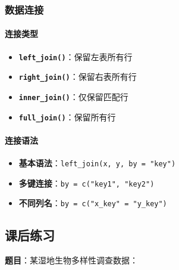 \documentclass[
]{book}
\providecommand{\tightlist}{%
  \setlength{\itemsep}{0pt}\setlength{\parskip}{0pt}}
\begin{document}
\hypertarget{ux6570ux636eux8fdeux63a5-1}{%
\subsubsection{数据连接}\label{ux6570ux636eux8fdeux63a5-1}}

\hypertarget{ux8fdeux63a5ux7c7bux578b}{%
\paragraph{连接类型}\label{ux8fdeux63a5ux7c7bux578b}}

\begin{itemize}
\tightlist
\item
  \textbf{\texttt{left\_join()}}：保留左表所有行
\item
  \textbf{\texttt{right\_join()}}：保留右表所有行
\item
  \textbf{\texttt{inner\_join()}}：仅保留匹配行
\item
  \textbf{\texttt{full\_join()}}：保留所有行
\end{itemize}

\hypertarget{ux8fdeux63a5ux8bedux6cd5}{%
\paragraph{连接语法}\label{ux8fdeux63a5ux8bedux6cd5}}

\begin{itemize}
\tightlist
\item
  \textbf{基本语法}：\texttt{left\_join(x,\ y,\ by\ =\ "key")}
\item
  \textbf{多键连接}：\texttt{by\ =\ c("key1",\ "key2")}
\item
  \textbf{不同列名}：\texttt{by\ =\ c("x\_key"\ =\ "y\_key")}
\end{itemize}

\hypertarget{ux8bfeux540eux7ec3ux4e60-8}{%
\subsection{课后练习}\label{ux8bfeux540eux7ec3ux4e60-8}}

\textbf{题目}：某湿地生物多样性调查数据：
\end{document}
